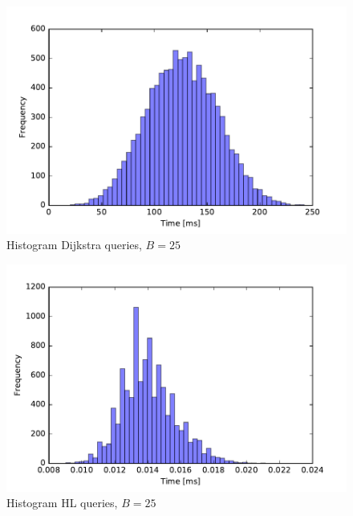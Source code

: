 \begin{figure}\label{fig:SF_query_dij} \caption{Histogram Dijkstra queries, $B=25$}
\begin{center}
\includegraphics[scale=0.5]{TexImg/SF_query_dij_B25.pdf}
\end{center}
\end{figure}

\begin{figure}\label{fig:SF_query_hl} \caption{Histogram HL queries, $B=25$}
\begin{center}
\includegraphics[scale=0.5]{TexImg/SF_query_hl_B25.pdf}
\end{center}
\end{figure}

